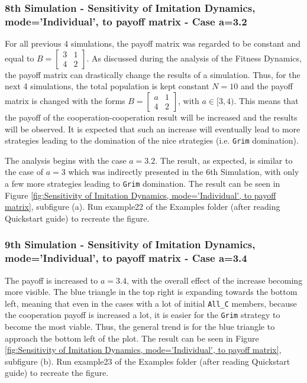 \subsubsection{8th Simulation - Sensitivity of Imitation Dynamics, mode='Individual', to payoff matrix - Case a=3.2}
For all previous 4 simulations, the payoff matrix was regarded to be constant and equal to $B = \begin{bmatrix} 3 & 1 \\ 4 & 2 \end{bmatrix}$. As discussed during the analysis of the Fitness Dynamics, the payoff matrix can drastically change the results of a simulation. Thus, for the next 4 simulations, the total population is kept constant $N=10$ and the payoff matrix is changed with the forms $B = \begin{bmatrix} a & 1 \\ 4 & 2 \end{bmatrix}$, with $a \in [3,4)$. This means that the payoff of the cooperation-cooperation result will be increased and the results will be observed. It is expected that such an increase will eventually lead to more strategies leading to the domination of the nice strategies (i.e. \texttt{Grim} domination). 

The analysis begins with the case $a = 3.2$. The result, as expected, is similar to the case of $a=3$ which was indirectly presented in the 6th Simulation, with only a few more strategies leading to \texttt{Grim} domination. The result can be seen in Figure \ref{fig:Sensitivity of Imitation Dynamics, mode='Individual', to payoff matrix}, subfigure (a). Run example22 of the Examples folder (after reading Quickstart guide) to recreate the figure.

\subsubsection{9th Simulation - Sensitivity of Imitation Dynamics, mode='Individual', to payoff matrix - Case a=3.4}
The payoff is increased to $a=3.4$, with the overall effect of the increase becoming more visible. The blue triangle in the top right is expanding towards the bottom left, meaning that even in the cases with a lot of initial \texttt{All\_C} members, because the cooperation payoff is increased a lot, it is easier for the \texttt{Grim} strategy to become the most viable. Thus, the general trend is for the blue triangle to approach the bottom left of the plot. The result can be seen in Figure \ref{fig:Sensitivity of Imitation Dynamics, mode='Individual', to payoff matrix}, subfigure (b). Run example23 of the Examples folder (after reading Quickstart guide) to recreate the figure.


